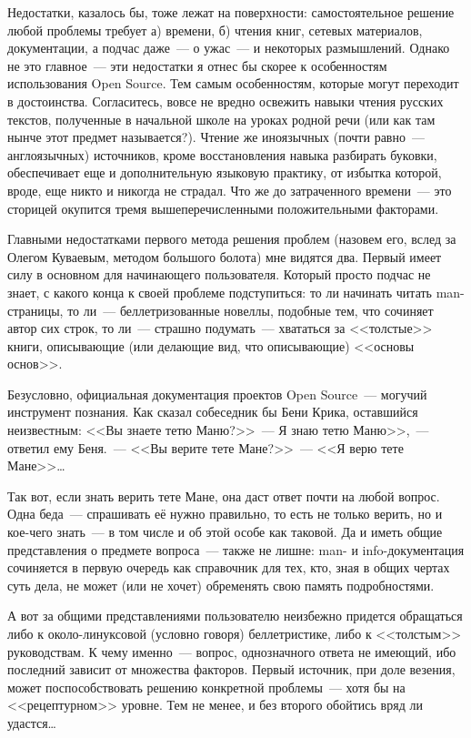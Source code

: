 Недостатки, казалось бы, тоже лежат на поверхности: самостоятельное решение любой проблемы требует а) времени, б) чтения книг, сетевых материалов, документации, а подчас даже~--- о ужас~--- и некоторых размышлений. Однако не это главное~--- эти недостатки я отнес бы скорее к особенностям использования Open Source. Тем самым особенностям, которые могут переходит в достоинства. Согласитесь, вовсе не вредно освежить навыки чтения русских текстов, полученные в начальной школе на уроках родной речи (или как там нынче этот предмет называется?). Чтение же иноязычных (почти равно~--- англоязычных) источников, кроме восстановления навыка разбирать буковки, обеспечивает еще и дополнительную языковую практику, от избытка которой, вроде, еще никто и никогда не страдал. Что же до затраченного времени~--- это сторицей окупится тремя вышеперечисленными положительными факторами.

Главными недостатками первого метода решения проблем (назовем его, вслед за Олегом Куваевым, методом большого болота) мне видятся два. Первый имеет силу в основном для начинающего пользователя. Который просто подчас не знает, с какого конца к своей проблеме подступиться: то ли начинать читать man-страницы, то ли~--- беллетризованные новеллы, подобные тем, что сочиняет автор сих строк, то ли~--- страшно подумать~--- хвататься за <<толстые>> книги, описывающие (или делающие вид, что описывающие) <<основы основ>>.

Безусловно, официальная документация проектов Open Source~--- могучий инструмент познания. Как сказал собеседник бы Бени Крика, оставшийся неизвестным: <<Вы знаете тетю Маню?>>~--- Я знаю тетю Маню>>,~--- ответил ему Беня.~--- <<Вы верите тете Мане?>>~--- <<Я верю тете Мане>>\dots

Так вот, если знать верить тете Мане, она даст ответ почти на любой вопрос. Одна беда~--- спрашивать её нужно правильно, то есть не только верить, но и кое-чего знать~--- в том числе и об этой особе как таковой. Да и иметь общие представления о предмете вопроса~--- также не лишне: man- и info-документация сочиняется в первую очередь как справочник для тех, кто, зная в общих чертах суть дела, не может (или не хочет) обременять свою память подробностями.

А вот за общими представлениями пользователю неизбежно придется обращаться либо к около-линуксовой (условно говоря) беллетристике, либо к <<толстым>> руководствам. К чему именно~--- вопрос, однозначного ответа не имеющий, ибо последний зависит от множества факторов. Первый источник, при доле везения, может поспособствовать решению конкретной проблемы~--- хотя бы на <<рецептурном>> уровне. Тем не менее, и без второго обойтись вряд ли удастся\dots

